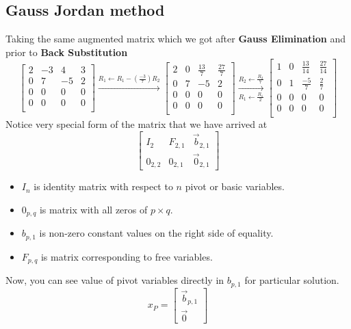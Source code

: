 \documentclass{article}
\begin{document}
 \subsection{Gauss Jordan method}
 Taking the same augmented matrix which we got after \textbf{Gauss Elimination} and prior to \textbf{Back Substitution}
 \[
 \left[\begin{array}{ccc|c}
     2 &-3 &4 &3\\
     0 &7 &-5 &2\\
     0 &0 &0 &0\\
     0 &0 &0 &0\\
  \end{array}\right]
  \xrightarrow{R_1\leftarrow R_1 -(\frac{-3}{7})R_2}
  \left[\begin{array}{ccc|c}
     2 &0 &\frac{13}{7} &\frac{27}{7}\\
     0 &7 &-5 &2\\
     0 &0 &0 &0\\
     0 &0 &0 &0\\
  \end{array}\right]
  \xrightarrow[R_1\leftarrow \frac{R_1}{2}]{R_2\leftarrow \frac{R_2}{7}}
  \left[\begin{array}{ccc|c}
    1 &0 &\frac{13}{14} &\frac{27}{14}\\
    0 &1 &\frac{-5}{7} &\frac{2}{7}\\
    0 &0 &0 &0\\
    0 &0 &0 &0\\
  \end{array}\right]
\]
Notice very special form of the matrix that we have arrived at\\
\[
\left[\begin{array}{c|c|c}
    I_2  &F_{2,1} &\vec{b}_{2,1}\\
    \hline 
    0_{2,2} &0_{2,1} &\vec{0}_{2,1}
  \end{array}\right]\]
\begin{itemize}
\item$I_n$ is identity matrix with respect to $n$ pivot or basic variables.
\item$0_{p,q}$ is matrix with all zeros of $p\times q$.
\item$b_{p,1}$ is non-zero constant values on the right side of equality.
\item$F_{p,q}$ is matrix corresponding to free variables.
\end{itemize}

Now, you can see value of pivot variables directly in $b_{p,1}$ for particular solution. 
\[
x_P = \begin{bmatrix}
    \vec{b}_{p,1}\\
     \hline
     \vec{0}
\end{bmatrix}
\]
\end{document}
